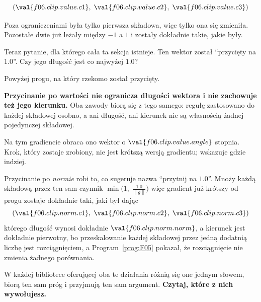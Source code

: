 \begin{fr}
\begin{ansblock}
\[ (\val{f06.clip.value.c1},\; \val{f06.clip.value.c2},\;
   \val{f06.clip.value.c3}) \]
\end{ansblock}

Poza ograniczeniami była tylko pierwsza składowa, więc tylko ona się zmieniła.
Pozostałe dwie już leżały między $-1$ a $1$ i zostały dokładnie takie, jakie
były.

Teraz pytanie, dla którego cała ta sekcja istnieje. Ten wektor został
\enquote{przycięty na $\num{1.0}$}. Czy jego długość jest co najwyżej
$\num{1.0}$?
\dotline
\nextframe
\end{fr}

\begin{fr}
Powyżej progu, na który rzekomo został przycięty.

\begin{trapbox}
\textbf{Przycinanie po wartości nie ogranicza długości wektora i nie zachowuje
też jego kierunku.} Oba zawody biorą się z tego samego: regułę zastosowano do
każdej składowej osobno, a ani długość, ani kierunek nie są własnością żadnej
pojedynczej składowej.

Na tym gradiencie obraca ono wektor o $\val{f06.clip.value.angle}$ stopnia.
Krok, który zostaje zrobiony, nie jest krótszą wersją gradientu; wskazuje
gdzie indziej.

Przycinanie po \emph{normie} robi to, co sugeruje nazwa \enquote{przytnij na
$\num{1.0}$}. Mnoży każdą składową przez ten sam czynnik
$\min\bigl(1,\; \frac{\num{1.0}}{\lVert g \rVert}\bigr)$ \dash{} więc gradient
już krótszy od progu zostaje dokładnie taki, jaki był \dash{} dając
\[ (\val{f06.clip.norm.c1},\; \val{f06.clip.norm.c2},\;
   \val{f06.clip.norm.c3}) \]
którego długość wynosi dokładnie $\val{f06.clip.norm.norm}$, a kierunek jest
dokładnie pierwotny, bo przeskalowanie każdej składowej przez jedną dodatnią
liczbę jest rozciągnięciem, a Program~\ref{prog:F05} pokazał, że rozciągnięcie
nie zmienia żadnego porównania.

W każdej bibliotece oferującej oba te działania różnią się one jednym słowem,
biorą ten sam próg i przyjmują ten sam argument. \textbf{Czytaj, które z nich
wywołujesz.}
\end{trapbox}
\end{fr}

